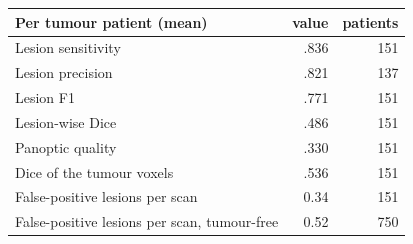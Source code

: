 \begin{tabular}{lrr}
\toprule
Per tumour patient (mean) & value & patients \\
\midrule
Lesion sensitivity & .836 & 151 \\
Lesion precision & .821 & 137 \\
Lesion F1 & .771 & 151 \\
Lesion-wise Dice & .486 & 151 \\
Panoptic quality & .330 & 151 \\
Dice of the tumour voxels & .536 & 151 \\
False-positive lesions per scan & 0.34 & 151 \\
False-positive lesions per scan, tumour-free & 0.52 & 750 \\
\bottomrule
\end{tabular}
